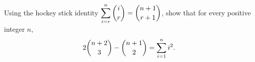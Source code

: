 Using the hockey stick identity $\displaystyle\sum_{i=r}^{n}\dbinom{i}{r}=\dbinom{n+1}{r+1}$, show that for every positive integer $n$,
\[2\dbinom{n+2}{3}-\dbinom{n+1}{2}=\sum_{i=1}^{n}i^2 .\]
